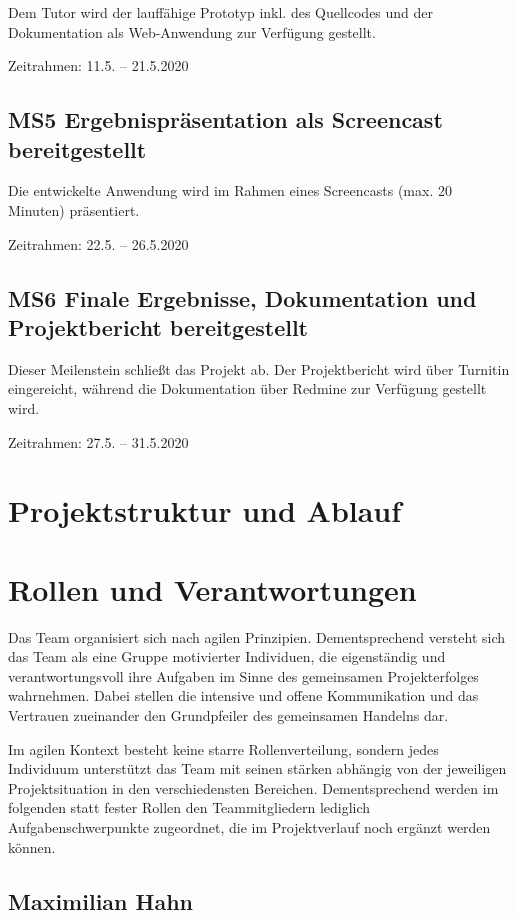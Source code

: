\documentclass[a4paper,11pt,listof=numbered,glossary=totoc,parskip=half]{scrreprt}
\begin{document}
Dem Tutor wird der lauffähige Prototyp inkl. des Quellcodes und der Dokumentation als Web-Anwendung zur Verfügung gestellt.

Zeitrahmen: 11.5. -- 21.5.2020

\subsection{MS5 Ergebnispräsentation als Screencast bereitgestellt}

Die entwickelte Anwendung wird im Rahmen eines Screencasts (max. 20 Minuten) präsentiert.

Zeitrahmen: 22.5. -- 26.5.2020

\subsection{MS6 Finale Ergebnisse, Dokumentation und Projektbericht bereitgestellt}

Dieser Meilenstein schließt das Projekt ab. Der Projektbericht wird über Turnitin eingereicht, während die Dokumentation über Redmine zur Verfügung gestellt wird.

Zeitrahmen: 27.5. -- 31.5.2020

	\newpage
	\section{Projektstruktur und Ablauf}

	\newpage
	\section{Rollen und Verantwortungen}	

Das Team organisiert sich nach agilen Prinzipien. Dementsprechend versteht sich das Team als eine Gruppe motivierter Individuen, die eigenständig und verantwortungsvoll ihre Aufgaben im Sinne des gemeinsamen Projekterfolges wahrnehmen. Dabei stellen die intensive und offene Kommunikation und das Vertrauen zueinander den Grundpfeiler des gemeinsamen Handelns dar.

Im agilen Kontext besteht keine starre Rollenverteilung, sondern jedes Individuum unterstützt das Team mit seinen stärken abhängig von der jeweiligen Projektsituation in den verschiedensten Bereichen.
Dementsprechend werden im folgenden statt fester Rollen den Teammitgliedern lediglich Aufgabenschwerpunkte zugeordnet, die im Projektverlauf noch ergänzt werden können.

\subsection{Maximilian Hahn}
\end{document}
